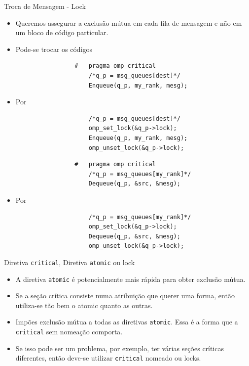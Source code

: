 	\begin{frame}[fragile]{Troca de Mensagem -  Lock}
		\begin{itemize}
			\item Queremos assegurar a exclusão mútua em cada fila de mensagem e não em um bloco de código particular.
			\item Pode-se trocar os códigos
		\end{itemize}

		\begin{multicols}{2}
				\begin{verbatim}
					#	pragma omp critical
						/*q_p = msg_queues[dest]*/
						Enqueue(q_p, my_rank, mesg);
				\end{verbatim}
			\begin{itemize}
				\item Por
			\end{itemize}
				\begin{verbatim}
						/*q_p = msg_queues[dest]*/
						omp_set_lock(&q_p->lock);
						Enqueue(q_p, my_rank, mesg);
						omp_unset_lock(&q_p->lock);
				\end{verbatim}
		\columnbreak
				\begin{verbatim}
					#	pragma omp critical
						/*q_p = msg_queues[my_rank]*/
						Dequeue(q_p, &src, &mesg);
				\end{verbatim}
			\begin{itemize}
				\item Por
			\end{itemize}
				\begin{verbatim}
						/*q_p = msg_queues[my_rank]*/
						omp_set_lock(&q_p->lock);
						Dequeue(q_p, &src, &mesg);
						omp_unset_lock(&q_p->lock);
				\end{verbatim}
		\end{multicols}
\end{frame}

	\begin{frame}{Diretiva {\tt critical}, Diretiva {\tt atomic} ou lock}
		\begin{itemize}
			\item A diretiva {\tt atomic} é potencialmente mais rápida para obter exclusão mútua.
			\item Se a seção crítica consiste numa atribuição que querer uma forma, então utiliza-se tão bem o atomic quanto as outras.
			\item Impões exclusão mútua a todas as diretivas {\tt atomic}. Essa é a forma que a {\tt critical} sem nomeação comporta.
			\item Se isso pode ser um problema, por exemplo, ter várias seções críticas diferentes, então deve-se utilizar {\tt critical} nomeado ou locks.
		\end{itemize}
	\end{frame}


